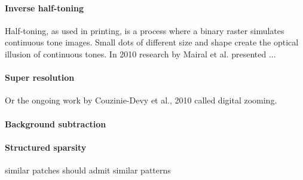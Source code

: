 
\paragraph{Inverse half-toning} Half-toning, as used in printing, is a process
where a binary raster simulates continuous tone images. Small dots of different
size and shape create the optical illusion of continuous tones. In 2010 research
by Mairal et al.\cite{Mairal2010b} presented ...


\paragraph{Super resolution} \cite{Wright2008,Yang2010, Yang2010}  
Or the ongoing work by Couzinie-Devy et al., 2010 called digital zooming.

\paragraph{Background subtraction}\cite{}

\paragraph{Structured sparsity}
similar patches should admit similar patterns \cite{Mairal2009} 
\cite{group sparsity}








